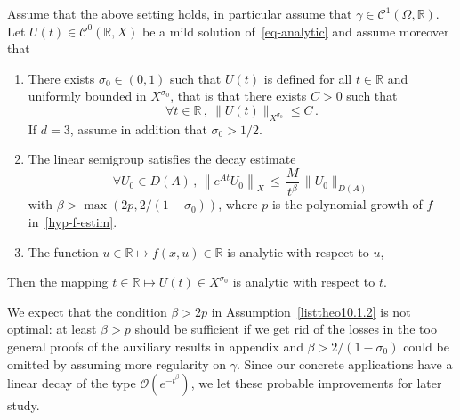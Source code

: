 \documentclass[AHL,Unicode,longabstracts]{cedram}
\newcommand{\RR}{\mathbb{R}}
\newcommand{\Cc}{\mathcal{C}}
\newcommand{\Oc}{\mathcal{O}}
\newcommand*{\romanenumi}{\renewcommand*{\theenumi}{\roman{enumi}}}
\let\oldforall\forall
\renewcommand*{\forall}{\mathrel{\oldforall}}
\begin{document}
\begin{theo}\label{th-analytic}
Assume that the above setting holds, in particular assume that $\gamma\in \Cc^1(\Omega,\RR)$. Let $U(t)\in\Cc^0(\RR,X)$ be a mild solution of~\eqref{eq-analytic} and assume moreover that
\begin{enumerate}\romanenumi
\item \label{listtheo10.1.1}There exists $\sigma_0\in (0,1)$ such that $U(t)$ is defined for all $t\in\RR$ and uniformly bounded in $X^{\sigma_0}$, that is that there exists $C>0$ such that
\[
\forall t\in\RR\,,\:\|U(t)\|_{X^{\sigma_0}}\leq C\,.
\]
If $d=3$, assume in addition that $\sigma_0>1/2$.
\item \label{listtheo10.1.2}The linear semigroup satisfies the decay estimate
\begin{equation}\label{hyp-decay-analytic}
\forall U_0\in D(A)\,,\,\left\|e^{At}U_0\right\|_X\,\leq\,\frac M {t^{\beta}}\,\|U_0\|_{D(A)}
\end{equation}
with $\beta>\max(2p,2/(1-\sigma_0))$, where $p$ is the polynomial growth of $f$ in~\eqref{hyp-f-estim}.
\item \label{listtheo10.1.3}The function $u\in\RR \mapsto f(x,u)\in\RR$ is analytic with respect to $u$,
\end{enumerate}
Then the mapping $t\in\RR \mapsto U(t)\in X^{\sigma_0}$ is analytic with respect to $t$.
\end{theo}

We expect that the condition $\beta>2p$ in Assumption~\eqref{listtheo10.1.2} is not optimal: at least $\beta>p$ should be sufficient if we get rid of the losses in the too general proofs of the auxiliary results in appendix and $\beta>2/(1-\sigma_0)$ could be omitted by assuming more regularity on $\gamma$. Since our concrete applications have a linear decay of the type $\Oc(e^{-t^{\beta}})$, we let these probable improvements for later study.

\end{document}

